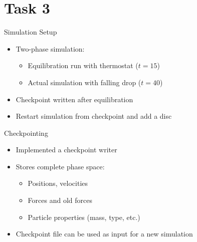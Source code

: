 \documentclass[aspectratio=169]{beamer}
\begin{document}
    \section{Task 3}

    \begin{frame}{Simulation Setup}
        \begin{itemize}
            \item Two-phase simulation:
            \begin{itemize}
                \item Equilibration run with thermostat ($t = 15$)
                \item Actual simulation with falling drop ($t = 40$)
            \end{itemize}
            \item Checkpoint written after equilibration
            \item Restart simulation from checkpoint and add a disc
        \end{itemize}
    \end{frame}

    \begin{frame}{Checkpointing}
        \begin{itemize}
            \item Implemented a checkpoint writer
            \item Stores complete phase space:
            \begin{itemize}
                \item Positions, velocities
                \item Forces and old forces
                \item Particle properties (mass, type, etc.)
            \end{itemize}
            \item Checkpoint file can be used as input for a new simulation
        \end{itemize}
    \end{frame}
\end{document}
